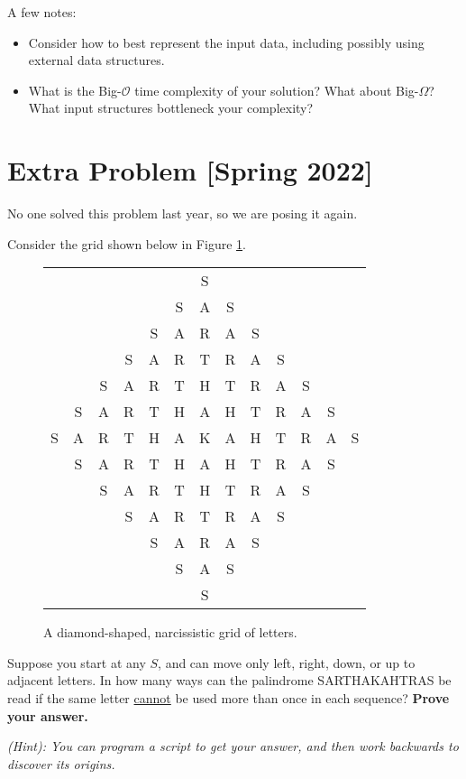 \documentclass{article}
\begin{document}
    \vspace{2mm}
    A few notes:
    \begin{itemize}
        \item Consider how to best represent the input data, including possibly using external data structures.
        \item What is the Big-$\mathcal{O}$ time complexity of your solution? What about Big-$\Omega$? What input structures bottleneck your complexity?
    \end{itemize}

\pagebreak

\section*{Extra Problem [Spring 2022]}
    No one solved this problem last year, so we are posing it again.
    
    \vspace{2mm}
    Consider the grid shown below in Figure \ref*{E2}.
    
    \vspace{1mm}
    \setlength{\tabcolsep}{2.7pt}
    \begin{figure}[hbp]
        \centering
        \begin{tabular}{ccccccccccccc}
            & & & & & & S \\
            & & & & & S & A & S \\
            & & & & S & A & R & A & S \\
            & & & S & A & R & T & R & A & S \\
            & & S & A & R & T & H & T & R & A & S \\
            & S & A & R & T & H & A & H & T & R & A & S \\
            S & A & R & T & H & A & K & A & H & T & R & A & S \\
            & S & A & R & T & H & A & H & T & R & A & S \\
            & & S & A & R & T & H & T & R & A & S \\
            & & & S & A & R & T & R & A & S \\
            & & & & S & A & R & A & S \\
            & & & & & S & A & S \\
            & & & & & & S
        \end{tabular}
        \caption{A diamond-shaped, narcissistic grid of letters.}
        \label{E2}
    \end{figure}
    
    Suppose you start at any $S$, and can move only left, right, down, or up to adjacent letters. In how many ways can the palindrome SARTHAKAHTRAS be read if the same letter \underline{cannot} be used more than once in each sequence? \textbf{Prove your answer.}

    \vspace{2mm}
    \textit{(Hint): You can program a script to get your answer, and then work backwards to discover its origins.}
\end{document}
